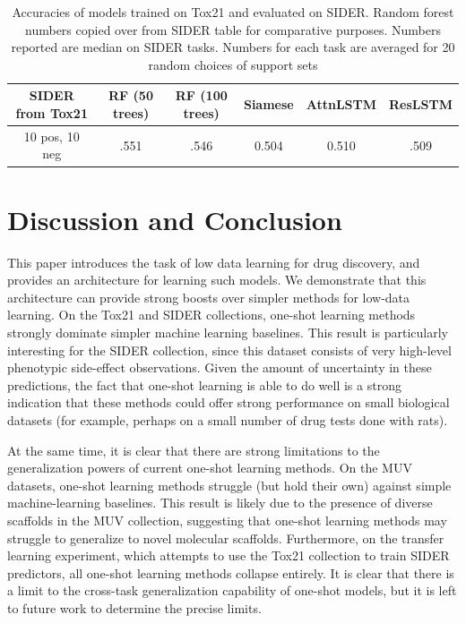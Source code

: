\documentclass[journal=jacsat,manuscript=article]{achemso}
\begin{document}
\begin{table}
    \centering
    \begin{tabular}{ |c|c|c|c|c|c| } 
    \hline
    SIDER from Tox21 & RF (50 trees) & RF (100 trees) & Siamese & AttnLSTM & ResLSTM \\ 
    \hline
    10 pos, 10 neg & .551 & .546 & 0.504 & 0.510 & .509 \\
    \hline
    \end{tabular}
    \caption{Accuracies of models trained on Tox21 and evaluated on SIDER. Random forest numbers copied over from SIDER table for comparative purposes. Numbers reported are median on SIDER tasks. Numbers for each task are averaged for 20 random choices of support sets}
    \label{tab:transfer}
\end{table}

\section{Discussion and Conclusion}

This paper introduces the task of low data learning for drug discovery, and provides an architecture for learning such models. We demonstrate that this architecture can provide strong boosts over simpler methods for low-data learning. On the Tox21 and SIDER collections, one-shot learning methods strongly dominate simpler machine learning baselines. This result is particularly interesting for the SIDER collection, since this dataset consists of very high-level phenotypic side-effect observations. Given the amount of uncertainty in these predictions, the fact that one-shot learning is able to do well is a strong indication that these methods could offer strong performance on small biological datasets (for example, perhaps on a small number of drug tests done with rats).

At the same time, it is clear that there are strong limitations to the generalization powers of current one-shot learning methods. On the MUV datasets, one-shot learning methods struggle (but hold their own) against simple machine-learning baselines. This result is likely due to the presence of diverse scaffolds in the MUV collection, suggesting that one-shot learning methods may struggle to generalize to novel molecular scaffolds. Furthermore, on the transfer learning experiment, which attempts to use the Tox21 collection to train SIDER predictors, all one-shot learning methods collapse entirely. It is clear that there is a limit to the cross-task generalization capability of one-shot models, but it is left to future work to determine the precise limits.
\end{document}
